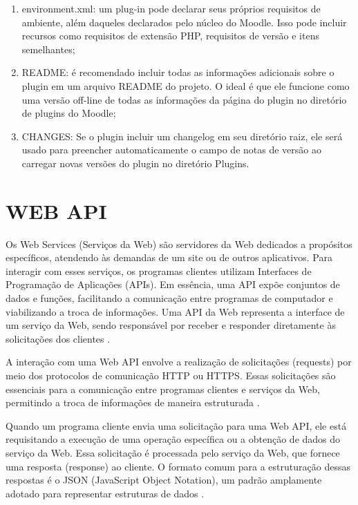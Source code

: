 \begin{enumerate} [label=(\alph*)]
    \item environment.xml: um plug-in pode declarar seus próprios requisitos de ambiente, além daqueles declarados pelo núcleo do Moodle. Isso pode incluir recursos como requisitos de extensão PHP, requisitos de versão e itens semelhantes;
    \item README: é recomendado incluir todas as informações adicionais sobre o plugin em um arquivo README do projeto. O ideal é que ele funcione como uma versão off-line de todas as informações da página do plugin no diretório de plugins do Moodle;
    \item CHANGES: Se o plugin incluir um changelog em seu diretório raiz, ele será usado para preencher automaticamente o campo de notas de versão ao carregar novas versões do plugin no diretório Plugins.
\end{enumerate}

\section{WEB API}

Os Web Services (Serviços da Web) são servidores da Web dedicados a propósitos específicos, atendendo às demandas de um site ou de outros aplicativos. Para interagir com esses serviços, os programas clientes utilizam Interfaces de Programação de Aplicações (APIs). Em essência, uma API expõe conjuntos de dados e funções, facilitando a comunicação entre programas de computador e viabilizando a troca de informações. Uma API da Web representa a interface de um serviço da Web, sendo responsável por receber e responder diretamente às solicitações dos clientes \cite[p.~5]{masse}.

A interação com uma Web API envolve a realização de solicitações (requests) por meio dos protocolos de comunicação HTTP ou HTTPS. Essas solicitações são essenciais para a comunicação entre programas clientes e serviços da Web, permitindo a troca de informações de maneira estruturada \cite[p.~18-20]{richardson}. 

Quando um programa cliente envia uma solicitação para uma Web API, ele está requisitando a execução de uma operação específica ou a obtenção de dados do serviço da Web. Essa solicitação é processada pelo serviço da Web, que fornece uma resposta (response) ao cliente. O formato comum para a estruturação dessas respostas é o JSON (JavaScript Object Notation), um padrão amplamente adotado para representar estruturas de dados \cite[p.~19-21]{richardson}. 

